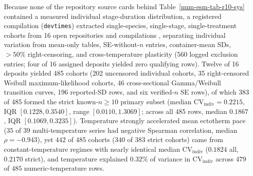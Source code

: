 Because none of the repository source cards behind Table~\ref{num-esm-tab-r10-sys} contained a measured individual stage-duration distribution, a registered compilation (\texttt{devtimes}) extracted single-species, single-stage, single-treatment cohorts from 16 open repositories and compilations \citep{gleichsner2016,shapiro2017,leclech2019,civitello2020,fracasso2022,nguyen2021,stopard2021,brunner2022,taskinen2022,aleuy2023,andrade2024}, separating individual variation from mean-only tables, SE-without-$n$ entries, container-mean SDs, $>50\%$ right-censoring, and cross-temperature plasticity (560 logged exclusion entries; four of 16 assigned deposits yielded zero qualifying rows). Twelve of 16 deposits yielded 485 cohorts (202 uncensored individual cohorts, 35 right-censored Weibull maximum-likelihood cohorts, 46 cross-sectional Gamma/Weibull transition curves, 196 reported-SD rows, and six verified-$n$ SE rows), of which 383 of 485 formed the strict known-$n \ge 10$ primary subset (median $\mathrm{CV}_{\mathrm{indiv}} = 0.2215$, IQR $[0.1228, 0.3540]$, range $[0.0110, 1.3069]$; across all 485 rows, median $0.1867$, IQR $[0.1069, 0.3235]$). Temperature strongly accelerated mean ectotherm pace ($35$ of $39$ multi-temperature series had negative Spearman correlation, median $\rho = -0.943$), yet $442$ of $485$ cohorts ($340$ of $383$ strict cohorts) came from constant-temperature regimes with nearly identical median $\mathrm{CV}_{\mathrm{indiv}}$ ($0.1824$ all, $0.2170$ strict), and temperature explained $0.32\%$ of variance in $\mathrm{CV}_{\mathrm{indiv}}$ across $479$ of $485$ numeric-temperature rows.

